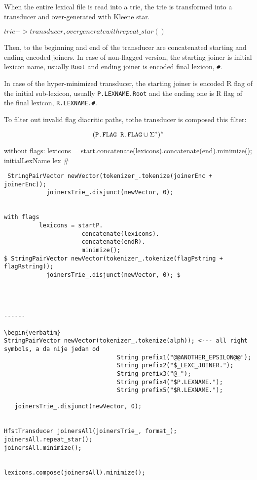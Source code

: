 \documentclass[11pt]{article}
\begin{document}
When the entire lexical file is read into a trie, the trie is transformed into a transducer and over-generated with Kleene star.

$trie -> transducer, overgenerate with repeat\_star()$

Then, to the beginning and end of the transducer are concatenated starting and ending encoded joiners. In case of non-flagged version, the starting joiner is initial lexicon name, usually \texttt{Root} and ending joiner is encoded final lexicon, \texttt{\#}.

In case of the hyper-minimized transducer, the starting joiner is encoded R flag of the initial sub-lexicon, usually \texttt{P.LEXNAME.Root} and the ending one is R flag of the final lexicon, \texttt{R.LEXNAME.\#}.


To filter out invalid flag diacritic paths, tothe transducer is composed this filter:




\begin{equation}\label{filter}
(\verb+P.FLAG R.FLAG+ \cup \Sigma^*)^* 
\end{equation}

without flags:
lexicons = start.concatenate(lexicons).concatenate(end).minimize();
            initialLexName lex \#
\begin{verbatim}
 StringPairVector newVector(tokenizer_.tokenize(joinerEnc + joinerEnc));
            joinersTrie_.disjunct(newVector, 0);
      
            
with flags
          lexicons = startP.
                      concatenate(lexicons).
                      concatenate(endR).
                      minimize();
$ StringPairVector newVector(tokenizer_.tokenize(flagPstring + flagRstring));
            joinersTrie_.disjunct(newVector, 0); $
            
            
            
            
------

\begin{verbatim}
StringPairVector newVector(tokenizer_.tokenize(alph)); <--- all right symbols, a da nije jedan od
                                String prefix1("@@ANOTHER_EPSILON@@");
                                String prefix2("$_LEXC_JOINER.");
                                String prefix3("@_");
                                String prefix4("$P.LEXNAME.");
                                String prefix5("$R.LEXNAME.");
 
   joinersTrie_.disjunct(newVector, 0);


HfstTransducer joinersAll(joinersTrie_, format_);
joinersAll.repeat_star();
joinersAll.minimize();


lexicons.compose(joinersAll).minimize();
\end{verbatim}
\end{document}
